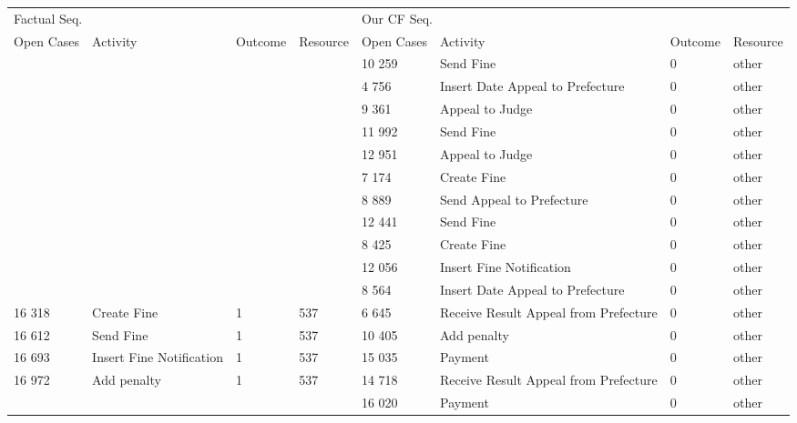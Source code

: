 \begin{tabular}{llllllll}
\toprule
\multicolumn{4}{l}{Factual Seq.} & \multicolumn{4}{l}{Our CF Seq.} \\
Open Cases & Activity & Outcome & Resource & Open Cases & Activity & Outcome & Resource \\
\midrule
 &  &  &  & 10 259 & Send Fine & 0 & other \\
 &  &  &  & 4 756 & Insert Date Appeal to Prefecture & 0 & other \\
 &  &  &  & 9 361 & Appeal to Judge & 0 & other \\
 &  &  &  & 11 992 & Send Fine & 0 & other \\
 &  &  &  & 12 951 & Appeal to Judge & 0 & other \\
 &  &  &  & 7 174 & Create Fine & 0 & other \\
 &  &  &  & 8 889 & Send Appeal to Prefecture & 0 & other \\
 &  &  &  & 12 441 & Send Fine & 0 & other \\
 &  &  &  & 8 425 & Create Fine & 0 & other \\
 &  &  &  & 12 056 & Insert Fine Notification & 0 & other \\
 &  &  &  & 8 564 & Insert Date Appeal to Prefecture & 0 & other \\
16 318 & Create Fine & 1 & 537 & 6 645 & Receive Result Appeal from Prefecture & 0 & other \\
16 612 & Send Fine & 1 & 537 & 10 405 & Add penalty & 0 & other \\
16 693 & Insert Fine Notification & 1 & 537 & 15 035 & Payment & 0 & other \\
16 972 & Add penalty & 1 & 537 & 14 718 & Receive Result Appeal from Prefecture & 0 & other \\
 &  &  &  & 16 020 & Payment & 0 & other \\
\bottomrule
\end{tabular}
